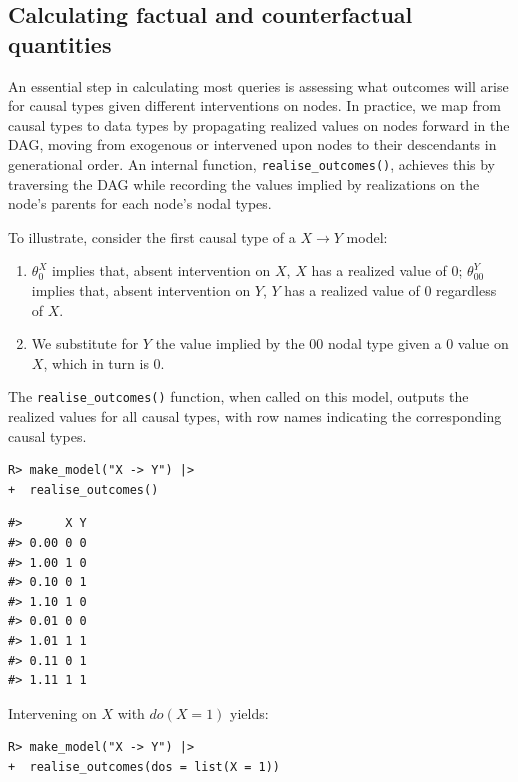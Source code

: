\documentclass[
  11pt,
  article]{jss}
\providecommand{\tightlist}{%
  \setlength{\itemsep}{0pt}\setlength{\parskip}{0pt}}\usepackage{longtable,booktabs,array}
\begin{document}
\subsection{Calculating factual and counterfactual
quantities}\label{sec-propagation}

An essential step in calculating most queries is assessing what outcomes
will arise for causal types given different interventions on nodes. In
practice, we map from causal types to data types by propagating realized
values on nodes forward in the DAG, moving from exogenous or intervened
upon nodes to their descendants in generational order. An internal
function, \texttt{realise\_outcomes()}, achieves this by traversing the
DAG while recording the values implied by realizations on the node's
parents for each node's nodal types.

To illustrate, consider the first causal type of a \(X \rightarrow Y\)
model:

\begin{enumerate}
\def\labelenumi{\arabic{enumi}.}
\tightlist
\item
  \(\theta^X_0\) implies that, absent intervention on \(X\), \(X\) has a
  realized value of \(0\); \(\theta^Y_{00}\) implies that, absent
  intervention on \(Y\), \(Y\) has a realized value of \(0\) regardless
  of \(X\).
\item
  We substitute for \(Y\) the value implied by the \(00\) nodal type
  given a \(0\) value on \(X\), which in turn is \(0\).
\end{enumerate}

The \texttt{realise\_outcomes()} function, when called on this model,
outputs the realized values for all causal types, with row names
indicating the corresponding causal types.

\begin{verbatim}
R> make_model("X -> Y") |> 
+  realise_outcomes()
\end{verbatim}

\begin{verbatim}
#>      X Y
#> 0.00 0 0
#> 1.00 1 0
#> 0.10 0 1
#> 1.10 1 0
#> 0.01 0 0
#> 1.01 1 1
#> 0.11 0 1
#> 1.11 1 1
\end{verbatim}

Intervening on \(X\) \citep[see][]{pearl_causality_2009} with
\(do(X=1)\) yields:

\begin{verbatim}
R> make_model("X -> Y") |> 
+  realise_outcomes(dos = list(X = 1))
\end{verbatim}
\end{document}
